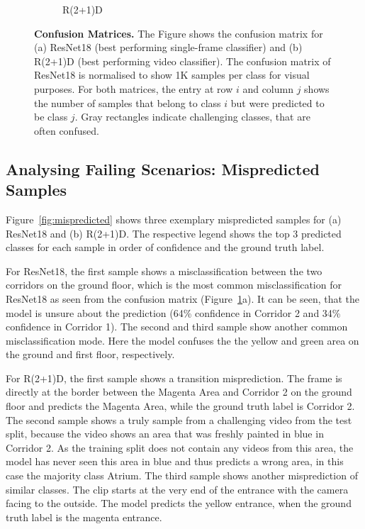 \documentclass[a4paper]{article}
\begin{document}
\begin{figure}
\begin{subfigure}[b]{0.49\textwidth}
      \caption{R(2+1)D}
    \end{subfigure}
    \caption{
      \textbf{Confusion Matrices.} The Figure shows the confusion matrix for (a)
      ResNet18 (best performing single-frame classifier) and (b) R(2+1)D (best
      performing video classifier). The confusion matrix of ResNet18 is
      normalised to show 1K samples per class for visual purposes. For both
      matrices, the entry at row $i$ and column $j$ shows the number of samples
      that belong to class $i$ but were predicted to be class $j$. Gray
      rectangles indicate challenging classes, that are often confused.
    }
    \label{fig:conf-matrix}
  \end{figure}


  \subsection{Analysing Failing Scenarios: Mispredicted Samples} %
  \label{sub:mispredicted}

  Figure~\ref{fig:mispredicted} shows three exemplary mispredicted samples for
  (a) ResNet18 and (b) R(2+1)D. The respective legend shows the top 3 predicted
  classes for each sample in order of confidence and the ground truth label. 

  For ResNet18, the first sample shows a misclassification between the two
  corridors on the ground floor, which is the most common misclassification for
  ResNet18 as seen from the confusion matrix (Figure~\ref{fig:conf-matrix}a). It
  can be seen, that the model is unsure about the prediction (64\% confidence in
  Corridor 2 and 34\% confidence in Corridor 1). The second and third sample
  show another common misclassification mode. Here the model confuses the 
  the yellow and green area on the ground and first floor, respectively.

  For R(2+1)D, the first sample shows a transition misprediction. The frame is
  directly at the border between the Magenta Area and Corridor 2 on the ground
  floor and predicts the Magenta Area, while the ground truth label is Corridor
  2. The second sample shows a truly sample from a challenging video from the
  test split, because the video shows an area that was freshly painted in blue
  in Corridor 2. As the training split does not contain any videos from this
  area, the model has never seen this area in blue and thus predicts a wrong
  area, in this case the majority class Atrium. The third sample shows another 
  misprediction of similar classes. The clip starts at the very end of the
  entrance with the camera facing to the outside. The model predicts the yellow
  entrance, when the ground truth label is the magenta entrance.
\end{document}
